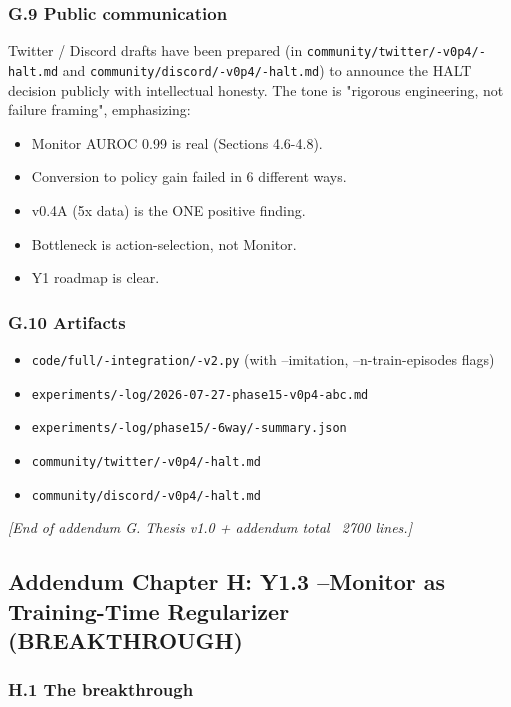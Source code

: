 \documentclass[11pt]{article}
\begin{document}
\subsubsection{G.9 Public communication}

Twitter / Discord drafts have been prepared (in \texttt{community/twitter/-v0p4/-halt.md}
and \texttt{community/discord/-v0p4/-halt.md}) to announce the HALT decision publicly
with intellectual honesty. The tone is "rigorous engineering, not failure
framing", emphasizing:

\begin{itemize}
  \item Monitor AUROC 0.99 is real (Sections 4.6-4.8).
  \item Conversion to policy gain failed in 6 different ways.
  \item v0.4A (5x data) is the ONE positive finding.
  \item Bottleneck is action-selection, not Monitor.
  \item Y1 roadmap is clear.
\end{itemize}


\subsubsection{G.10 Artifacts}

\begin{itemize}
  \item \texttt{code/full/-integration/-v2.py} (with --imitation, --n-train-episodes flags)
  \item \texttt{experiments/-log/2026-07-27-phase15-v0p4-abc.md}
  \item \texttt{experiments/-log/phase15/-6way/-summary.json}
  \item \texttt{community/twitter/-v0p4/-halt.md}
  \item \texttt{community/discord/-v0p4/-halt.md}
\end{itemize}


\hrulefill

\textit{[End of addendum G. Thesis v1.0 + addendum total ~2700 lines.]}


\hrulefill

\subsection{Addendum Chapter H: Y1.3 --Monitor as Training-Time Regularizer (BREAKTHROUGH)}

\subsubsection{H.1 The breakthrough}
\end{document}
